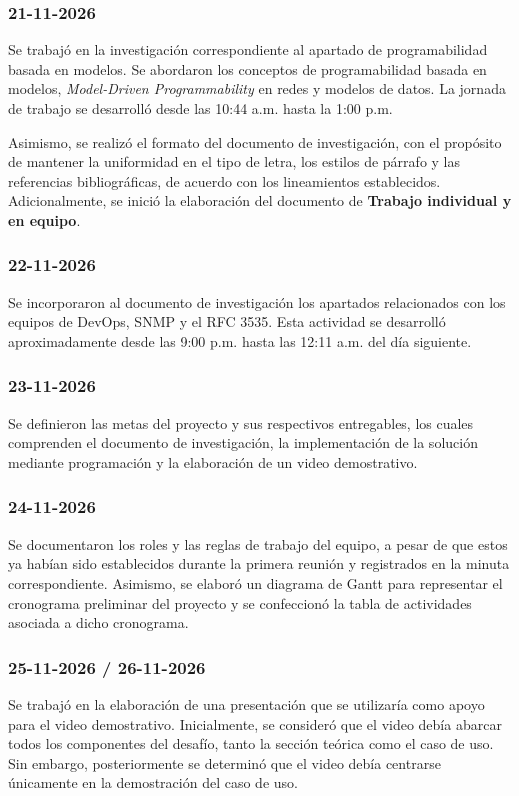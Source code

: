 \documentclass[12pt,a4paper]{article}
\begin{document}
\subsubsection{21-11-2026}
Se trabajó en la investigación correspondiente al apartado de programabilidad basada en modelos. Se abordaron los conceptos de programabilidad basada en modelos, \textit{Model-Driven Programmability} en redes y modelos de datos. La jornada de trabajo se desarrolló desde las 10:44 a.m. hasta la 1:00 p.m.

Asimismo, se realizó el formato del documento de investigación, con el propósito de mantener la uniformidad en el tipo de letra, los estilos de párrafo y las referencias bibliográficas, de acuerdo con los lineamientos establecidos. Adicionalmente, se inició la elaboración del documento de \textbf{Trabajo individual y en equipo}.

\subsubsection{22-11-2026}
Se incorporaron al documento de investigación los apartados relacionados con los equipos de DevOps, SNMP y el RFC 3535. Esta actividad se desarrolló aproximadamente desde las 9:00 p.m. hasta las 12:11 a.m. del día siguiente.

\subsubsection{23-11-2026}
Se definieron las metas del proyecto y sus respectivos entregables, los cuales comprenden el documento de investigación, la implementación de la solución mediante programación y la elaboración de un video demostrativo.

\subsubsection{24-11-2026}
Se documentaron los roles y las reglas de trabajo del equipo, a pesar de que estos ya habían sido establecidos durante la primera reunión y registrados en la minuta correspondiente. Asimismo, se elaboró un diagrama de Gantt para representar el cronograma preliminar del proyecto y se confeccionó la tabla de actividades asociada a dicho cronograma.

\subsubsection{25-11-2026 / 26-11-2026}
Se trabajó en la elaboración de una presentación que se utilizaría como apoyo para el video demostrativo. Inicialmente, se consideró que el video debía abarcar todos los componentes del desafío, tanto la sección teórica como el caso de uso. Sin embargo, posteriormente se determinó que el video debía centrarse únicamente en la demostración del caso de uso.
\end{document}
